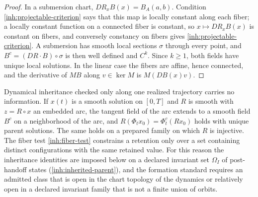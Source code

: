 \begin{proof}
In a submersion chart, $DR_xB(x)=B_A(a,b)$. Condition
\cref{inh:projectable-criterion} says that this map is locally constant
along each fiber; a locally constant function on a connected fiber is
constant, so $x\mapsto DR_xB(x)$ is constant on fibers, and conversely
constancy on fibers gives \cref{inh:projectable-criterion}. A submersion
has smooth local sections $\sigma$ through every point, and
$B^c=(DR\cdot B)\circ\sigma$ is then well defined and $C^k$. Since $k\geq1$,
both fields have unique local solutions. In the linear case the fibers are
affine, hence connected, and the derivative of $MB$ along $v\in\ker M$ is
$M(DB(x)v)$.
\end{proof}

Dynamical inheritance checked only along one realized trajectory carries no
information. If $x(t)$ is a smooth solution on $[0,T]$ and $R$ is smooth with
$z=R\circ x$ an embedded arc, the tangent field of the arc extends to a smooth
field $B^c$ on a neighborhood of the arc, and $R(\Phi_t x_0)=\Phi^c_t(Rx_0)$
holds with unique parent solutions. The same holds on a prepared family on
which $R$ is injective. The fiber test \cref{inh:fiber-test} constrains a
retention only over a set containing distinct configurations with the same
retained value. For this reason the inheritance identities are imposed below
on a declared invariant set $\Omega_I$ of post-handoff states
(\cref{inh:inherited-parent}), and the formation standard requires an
admitted class that is open in the chart topology of the dynamics or
relatively open in a declared invariant family that is not a finite union
of orbits.


